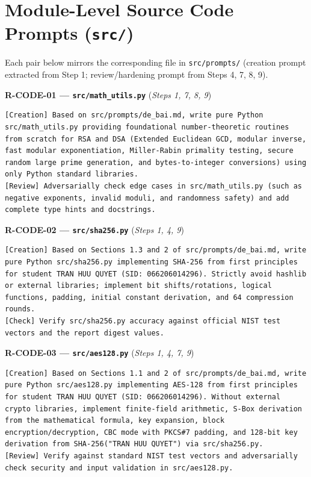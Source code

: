 \section{Module-Level Source Code Prompts (\texttt{src/})}
\label{sec:app_code_prompts}
Each pair below mirrors the corresponding file in \texttt{src/prompts/} (creation prompt extracted from Step 1; review/hardening prompt from Steps 4, 7, 8, 9).

\textbf{R-CODE-01 --- \texttt{src/math\_utils.py}} (\textit{Steps 1, 7, 8, 9})
\begin{lstlisting}[style=promptstyle]
[Creation] Based on src/prompts/de_bai.md, write pure Python src/math_utils.py providing foundational number-theoretic routines from scratch for RSA and DSA (Extended Euclidean GCD, modular inverse, fast modular exponentiation, Miller-Rabin primality testing, secure random large prime generation, and bytes-to-integer conversions) using only Python standard libraries.
[Review] Adversarially check edge cases in src/math_utils.py (such as negative exponents, invalid moduli, and randomness safety) and add complete type hints and docstrings.
\end{lstlisting}

\textbf{R-CODE-02 --- \texttt{src/sha256.py}} (\textit{Steps 1, 4, 9})
\begin{lstlisting}[style=promptstyle]
[Creation] Based on Sections 1.3 and 2 of src/prompts/de_bai.md, write pure Python src/sha256.py implementing SHA-256 from first principles for student TRAN HUU QUYET (SID: 066206014296). Strictly avoid hashlib or external libraries; implement bit shifts/rotations, logical functions, padding, initial constant derivation, and 64 compression rounds.
[Check] Verify src/sha256.py accuracy against official NIST test vectors and the report digest values.
\end{lstlisting}

\textbf{R-CODE-03 --- \texttt{src/aes128.py}} (\textit{Steps 1, 4, 7, 9})
\begin{lstlisting}[style=promptstyle]
[Creation] Based on Sections 1.1 and 2 of src/prompts/de_bai.md, write pure Python src/aes128.py implementing AES-128 from first principles for student TRAN HUU QUYET (SID: 066206014296). Without external crypto libraries, implement finite-field arithmetic, S-Box derivation from the mathematical formula, key expansion, block encryption/decryption, CBC mode with PKCS#7 padding, and 128-bit key derivation from SHA-256("TRAN HUU QUYET") via src/sha256.py.
[Review] Verify against standard NIST test vectors and adversarially check security and input validation in src/aes128.py.
\end{lstlisting}

